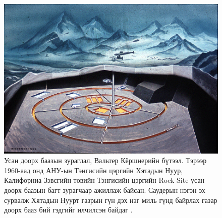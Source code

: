 \documentclass[10pt,twocolumn,letterpaper]{article}
\begin{document}
\begin{figure}[t]
\begin{center}
   \includegraphics[width=1\linewidth]{undersea.jpg}
\end{center}
   \caption{Усан доорх баазын зураглал, Вальтер Кёршнерийн бүтээл. Тэрээр 1960-аад онд АНУ-ын Тэнгисийн цэргийн Хятадын Нуур, Калифорниа Зэвсгийн төвийн Тэнгисийн цэргийн Rock-Site усан доорх баазын багт зурагчаар ажиллаж байсан. Саудерын нэгэн эх сурвалж Хятадын Нуурт газрын гүн дэх нэг миль гүнд байрлах газар доорх бааз бий гэдгийг илчилсэн байдаг \cite{22,23}.}
\label{fig:5}
\label{fig:onecol}
\end{figure}
\end{document}
